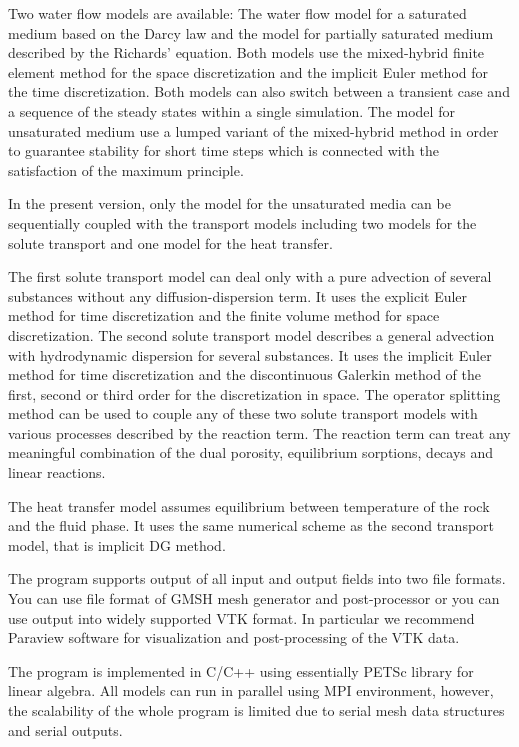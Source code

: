 \documentclass[12pt,a4paper]{report}
\begin{document}
Two water flow models are available: The water flow model for a saturated medium based on the Darcy law 
and the model for partially saturated medium described by the Richards' equation. 
Both models use the mixed-hybrid finite element method for the space discretization and the implicit Euler method for the time discretization. 
Both models can also switch between a transient case and a sequence of the steady states within a single simulation. The model for unsaturated medium use 
a lumped variant of the mixed-hybrid method in order to guarantee stability for short time steps which is connected with the satisfaction of the maximum principle.

In the present version,  only the model for the unsaturated media can be sequentially coupled  with the transport models including 
two models for the solute transport and one model for the heat transfer.

The first solute transport model can deal only with a pure advection of several substances without any diffusion-dispersion term. It uses 
the explicit Euler method for time discretization and the finite volume method for space discretization.
The second solute transport model describes a general advection with hydrodynamic dispersion for several substances. 
It uses the implicit Euler method for time discretization and the discontinuous Galerkin method of
the first, second or third order for the discretization in space.
The operator splitting method can be used to couple any of these two solute transport models with  
 various processes described by the reaction term.  The reaction term can treat any meaningful combination of the dual porosity, 
equilibrium sorptions, decays and linear reactions. 

The heat transfer model assumes equilibrium between temperature of the rock and the fluid phase. It uses the same numerical scheme as the second transport model, 
that is implicit DG method.

The program supports output of all input and output fields into two file formats. You can use file format of GMSH mesh generator and post-processor 
or you can use output into widely supported VTK format. In particular we recommend Paraview software for visualization and post-processing of the VTK data.

The program is implemented in C/C++ using essentially PETSc library for linear algebra. All models can run in parallel using MPI environment, however, 
the scalability of the whole program is limited due to serial mesh data structures and serial outputs.
\end{document}
